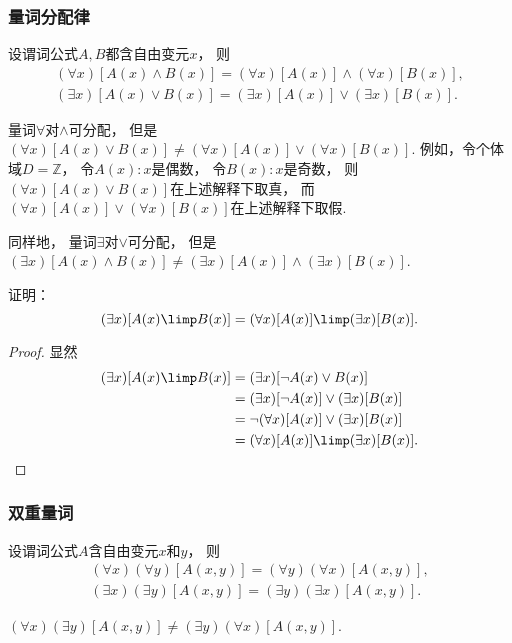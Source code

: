 \subsubsection{量词分配律}
设谓词公式\(A,B\)都含自由变元\(x\)，
则\begin{gather}
	(\forall x)[A(x) \land B(x)]
	= (\forall x)[A(x)] \land (\forall x)[B(x)], \\
	(\exists x)[A(x) \lor B(x)]
	= (\exists x)[A(x)] \lor (\exists x)[B(x)].
\end{gather}
\begin{remark}
量词\(\forall\)对\(\land\)可分配，
但是\((\forall x)[A(x) \lor B(x)]
\neq (\forall x)[A(x)] \lor (\forall x)[B(x)]\).
例如，令个体域\(D=\mathbb{Z}\)，
令\(A(x): \text{$x$是偶数}\)，
令\(B(x): \text{$x$是奇数}\)，
则\((\forall x)[A(x) \lor B(x)]\)在上述解释下取真，
而\((\forall x)[A(x)] \lor (\forall x)[B(x)]\)在上述解释下取假.

同样地，
量词\(\exists\)对\(\lor\)可分配，
但是\((\exists x)[A(x) \land B(x)]
\neq (\exists x)[A(x)] \land (\exists x)[B(x)]\).
\end{remark}

\begin{example}
证明：\begin{equation}
	(\exists x)[A(x) \limp B(x)]
	= (\forall x)[A(x)] \limp (\exists x)[B(x)].
\end{equation}
\begin{proof}
显然\begin{align*}
	(\exists x)[A(x) \limp B(x)]
	&= (\exists x)[\neg A(x) \lor B(x)] \\
	&= (\exists x)[\neg A(x)] \lor (\exists x)[B(x)] \\
	&= \neg(\forall x)[A(x)] \lor (\exists x)[B(x)] \\
	&= (\forall x)[A(x)] \limp (\exists x)[B(x)].
	\qedhere
\end{align*}
\end{proof}
\end{example}

\subsubsection{双重量词}
设谓词公式\(A\)含自由变元\(x\)和\(y\)，
则\begin{gather}
	(\forall x)(\forall y)[A(x,y)]
	= (\forall y)(\forall x)[A(x,y)], \\
	(\exists x)(\exists y)[A(x,y)]
	= (\exists y)(\exists x)[A(x,y)].
\end{gather}
\begin{remark}
\((\forall x)(\exists y)[A(x,y)]
\neq (\exists y)(\forall x)[A(x,y)]\).
\end{remark}

